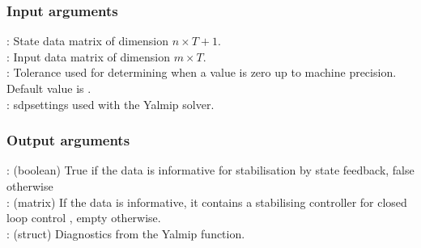 \subsubsection*{Input arguments}
\textbf{}: State data matrix of dimension $n \times T+1$.\\
\textbf{}: Input data matrix of dimension $m \times T$.\\
\textbf{}: Tolerance used for determining when a value is zero up to machine precision. Default value is .\\
\textbf{}: sdpsettings used with the Yalmip solver.

\subsubsection*{Output arguments}
\textbf{}: (boolean) True if the data is informative for stabilisation by state feedback, false otherwise\\
\textbf{}: (matrix) If the data is informative, it contains a stabilising controller  for closed loop control , empty otherwise.\\
\textbf{}: (struct) Diagnostics from the Yalmip  function.

